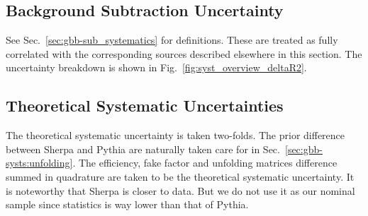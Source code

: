 \begin{enumerate}
  
\end{enumerate}

\subsection{Background Subtraction Uncertainty}
\label{sec:gbb-systs:background}

See Sec.~\ref{sec:gbb-sub_systematics} for definitions. These are treated as fully correlated with the corresponding sources described elsewhere in this section.  The uncertainty breakdown is shown in Fig.~\ref{fig:syst_overview_deltaR2}.
  

\subsection{Theoretical Systematic Uncertainties}
\label{sec:gbb-systs:theory}

The theoretical systematic uncertainty is taken two-folds. The prior difference between Sherpa and Pythia are naturally taken care for in Sec.~\ref{sec:gbb-systs:unfolding}. The efficiency, fake factor and unfolding matrices difference summed in quadrature are taken to be the theoretical systematic uncertainty. It is noteworthy that Sherpa is closer to data. But we do not use it as our nominal sample since statistics is way lower than that of Pythia.

